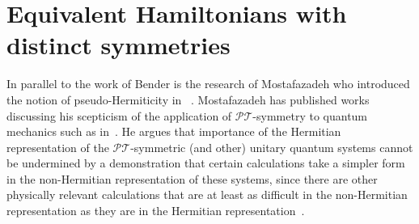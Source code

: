\documentclass[12pt, a4paper]{report}
\newcommand\PT{\(\mathcal{PT}\)}
\begin{document}
\section{Equivalent Hamiltonians with distinct symmetries}\label{EqHH}
In parallel to the work of Bender is the research of Mostafazadeh who introduced the notion of pseudo-Hermiticity in ~\cite{Mostafazadeh, Pseudo-HermiticityII, Pseudo-HermiticityIII, Mostafazadeh2, Mostafazadeh_2002}. Mostafazadeh has published works discussing his scepticism of the application of \PT-symmetry to quantum mechanics such as in~\cite{Critique}. He argues that importance of the Hermitian representation of the \PT-symmetric (and other) unitary quantum systems cannot be undermined by a demonstration that certain calculations take a simpler form in the non-Hermitian representation of these systems, since there are other physically relevant calculations that are at least as difficult in the non-Hermitian representation as they are in the Hermitian representation~\cite{Mostafazadeh_comment}.
\end{document}
